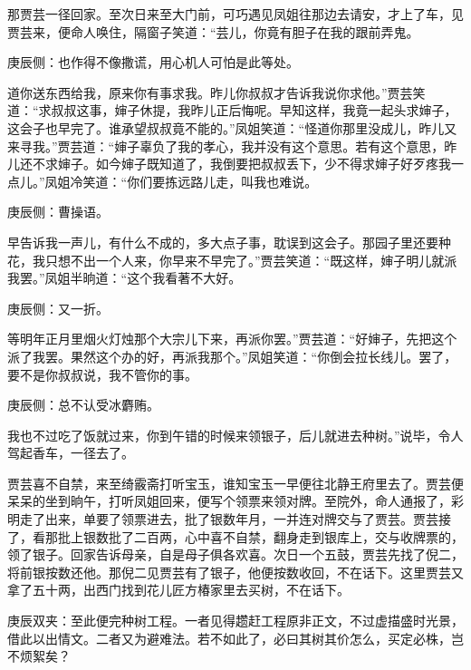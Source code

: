 \begin{parag}
    那贾芸一径回家。至次日来至大门前，可巧遇见凤姐往那边去请安，才上了车，见贾芸来，便命人唤住，隔窗子笑道：“芸儿，你竟有胆子在我的跟前弄鬼。\begin{note}庚辰侧：也作得不像撒谎，用心机人可怕是此等处。\end{note}道你送东西给我，原来你有事求我。昨儿你叔叔才告诉我说你求他。”贾芸笑道：“求叔叔这事，婶子休提，我昨儿正后悔呢。早知这样，我竟一起头求婶子，这会子也早完了。谁承望叔叔竟不能的。”凤姐笑道：“怪道你那里没成儿，昨儿又来寻我。”贾芸道：“婶子辜负了我的孝心，我并没有这个意思。若有这个意思，昨儿还不求婶子。如今婶子既知道了，我倒要把叔叔丢下，少不得求婶子好歹疼我一点儿。”凤姐冷笑道：“你们要拣远路儿走，叫我也难说。\begin{note}庚辰侧：曹操语。\end{note}早告诉我一声儿，有什么不成的，多大点子事，耽误到这会子。那园子里还要种花，我只想不出一个人来，你早来不早完了。”贾芸笑道：“既这样，婶子明儿就派我罢。”凤姐半晌道：“这个我看著不大好。\begin{note}庚辰侧：又一折。\end{note}等明年正月里烟火灯烛那个大宗儿下来，再派你罢。”贾芸道：“好婶子，先把这个派了我罢。果然这个办的好，再派我那个。”凤姐笑道：“你倒会拉长线儿。罢了，要不是你叔叔说，我不管你的事。\begin{note}庚辰侧：总不认受冰麝贿。\end{note}我也不过吃了饭就过来，你到午错的时候来领银子，后儿就进去种树。”说毕，令人驾起香车，一径去了。
\end{parag}


\begin{parag}
    贾芸喜不自禁，来至绮霰斋打听宝玉，谁知宝玉一早便往北静王府里去了。贾芸便呆呆的坐到晌午，打听凤姐回来，便写个领票来领对牌。至院外，命人通报了，彩明走了出来，单要了领票进去，批了银数年月，一并连对牌交与了贾芸。贾芸接了，看那批上银数批了二百两，心中喜不自禁，翻身走到银库上，交与收牌票的，领了银子。回家告诉母亲，自是母子俱各欢喜。次日一个五鼓，贾芸先找了倪二，将前银按数还他。那倪二见贾芸有了银子，他便按数收回，不在话下。这里贾芸又拿了五十两，出西门找到花儿匠方椿家里去买树，不在话下。\begin{note}庚辰双夹：至此便完种树工程。一者见得趱赶工程原非正文，不过虚描盛时光景，借此以出情文。二者又为避难法。若不如此了，必曰其树其价怎么，买定必株，岂不烦絮矣？\end{note}
\end{parag}


